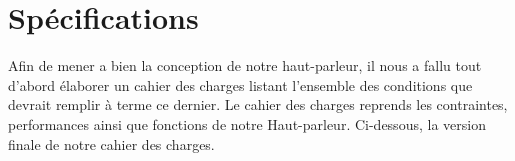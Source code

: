 \newenvironment{changemargin}[2]{\begin{list}{}{%
\setlength{\topsep}{0pt}%
\setlength{\leftmargin}{0pt}%
\setlength{\rightmargin}{0pt}%
\setlength{\listparindent}{\parindent}%
\setlength{\itemindent}{\parindent}%
\setlength{\parsep}{0pt plus 1pt}%
\addtolength{\leftmargin}{#1}%
\addtolength{\rightmargin}{#2}%
}\item }{\end{list}}
%

\section{Spécifications}

Afin de mener a bien la conception de notre haut-parleur, il nous a fallu tout d’abord élaborer un cahier des charges listant l’ensemble des conditions que devrait remplir  à terme ce dernier. Le cahier des charges reprends  les contraintes, performances ainsi que fonctions de notre Haut-parleur. Ci-dessous, la version finale de notre cahier des charges. 

